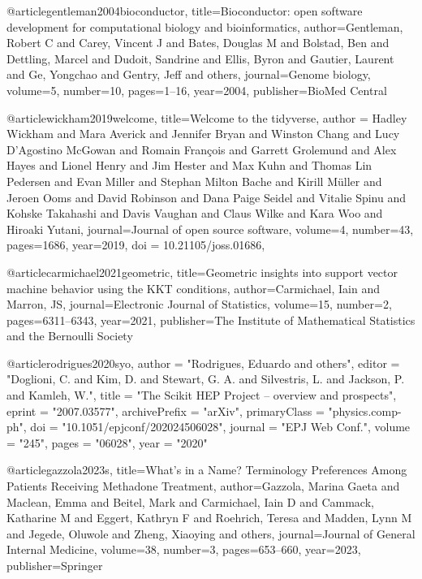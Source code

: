 @article{gentleman2004bioconductor,
  title={Bioconductor: open software development for computational biology and bioinformatics},
  author={Gentleman, Robert C and Carey, Vincent J and Bates, Douglas M and Bolstad, Ben and Dettling, Marcel and Dudoit, Sandrine and Ellis, Byron and Gautier, Laurent and Ge, Yongchao and Gentry, Jeff and others},
  journal={Genome biology},
  volume={5},
  number={10},
  pages={1--16},
  year={2004},
  publisher={BioMed Central}
}

@article{wickham2019welcome,
  title={Welcome to the  {tidyverse}},
  author = {Hadley Wickham and Mara Averick and Jennifer Bryan and
    Winston Chang and Lucy D'Agostino McGowan and Romain François and
    Garrett Grolemund and Alex Hayes and Lionel Henry and Jim Hester
    and Max Kuhn and Thomas Lin Pedersen and Evan Miller and Stephan
    Milton Bache and Kirill Müller and Jeroen Ooms and David Robinson
    and Dana Paige Seidel and Vitalie Spinu and Kohske Takahashi and
    Davis Vaughan and Claus Wilke and Kara Woo and Hiroaki Yutani},
  journal={Journal of open source software},
  volume={4},
  number={43},
  pages={1686},
  year={2019},
  doi = {10.21105/joss.01686},
}

@article{carmichael2021geometric,
  title={Geometric insights into support vector machine behavior using the KKT conditions},
  author={Carmichael, Iain and Marron, JS},
  journal={Electronic Journal of Statistics},
  volume={15},
  number={2},
  pages={6311--6343},
  year={2021},
  publisher={The Institute of Mathematical Statistics and the Bernoulli Society}
}

@article{rodrigues2020syo,
    author = "Rodrigues, Eduardo and others",
    editor = "Doglioni, C. and Kim, D. and Stewart, G. A. and Silvestris, L. and Jackson, P. and Kamleh, W.",
    title = "{The Scikit HEP Project -- overview and prospects}",
    eprint = "2007.03577",
    archivePrefix = "arXiv",
    primaryClass = "physics.comp-ph",
    doi = "10.1051/epjconf/202024506028",
    journal = "EPJ Web Conf.",
    volume = "245",
    pages = "06028",
    year = "2020"
}

@article{gazzola2023s,
  title={What’s in a Name? Terminology Preferences Among Patients Receiving Methadone Treatment},
  author={Gazzola, Marina Gaeta and Maclean, Emma and Beitel, Mark and Carmichael, Iain D and Cammack, Katharine M and Eggert, Kathryn F and Roehrich, Teresa and Madden, Lynn M and Jegede, Oluwole and Zheng, Xiaoying and others},
  journal={Journal of General Internal Medicine},
  volume={38},
  number={3},
  pages={653--660},
  year={2023},
  publisher={Springer}
}

